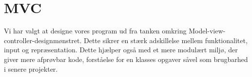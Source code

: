 \section{MVC}
Vi har valgt at designe vores program ud fra tanken omkring Model-view-controller-designmønstret. Dette sikrer en stærk adskillelse mellem funktionalitet, input og repræsentation. Dette hjælper også med et mere modulært miljø, der giver mere afprøvbar kode, forståelse for en klasses opgaver såvel som brugbarhed i senere projekter. 
